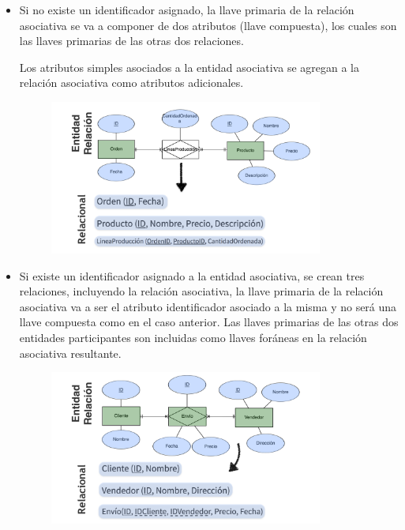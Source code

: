 \documentclass[12pt, fleqn]{report}                             %
\begin{document}
                \begin{itemize}
                    \item
                        Si no existe un identificador asignado, la llave primaria de la relación asociativa
                        se va a componer de dos atributos (llave compuesta), los cuales son las llaves
                        primarias de las otras dos relaciones. 

                        Los atributos simples asociados a la entidad asociativa se agregan a la relación
                        asociativa como atributos adicionales.

                        \begin{figure}[h]
                            \centering
                            \includegraphics[width=0.85\textwidth]{MapeoEntidadesAsociativas1}
                        \end{figure}

                    \clearpage

                    \item
                        Si existe un identificador asignado a la entidad asociativa, se crean tres relaciones,
                        incluyendo la relación asociativa, la llave primaria de la relación asociativa va a ser
                        el atributo identificador asociado a la misma y no será una llave compuesta como en el
                        caso anterior. Las llaves primarias de las otras dos entidades participantes son
                        incluidas como llaves foráneas en la relación asociativa resultante.

                        \begin{figure}[h]
                            \centering
                            \includegraphics[width=0.85\textwidth]{MapeoEntidadesAsociativas2}
                        \end{figure}

                \end{itemize}
\end{document}
